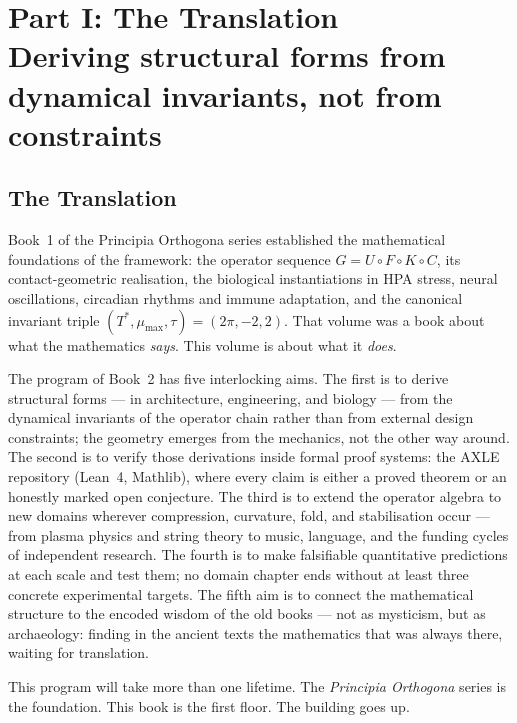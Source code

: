 \part[Part I: The Translation]{Part I: The Translation\\[0.3em]
\large\normalfont Deriving structural forms from dynamical invariants,
not from constraints}

\chapter{The Translation}

\noindent Book~1 of the Principia Orthogona series established the
mathematical foundations of the framework: the operator sequence
$G = U \circ F \circ K \circ C$, its contact-geometric realisation,
the biological instantiations in HPA stress, neural oscillations,
circadian rhythms and immune adaptation, and the canonical invariant
triple $(T^*, \mu_{\max}, \tau) = (2\pi, -2, 2)$. That volume
was a book about what the mathematics \emph{says}. This volume is
about what it \emph{does}.

The program of Book~2 has five interlocking aims. The first is to
derive structural forms --- in architecture, engineering, and biology
--- from the dynamical invariants of the operator chain rather than
from external design constraints; the geometry emerges from the
mechanics, not the other way around. The second is to verify those
derivations inside formal proof systems: the AXLE repository (Lean~4,
Mathlib), where every claim is either a proved theorem or an honestly
marked open conjecture. The third is to extend the operator algebra to
new domains wherever compression, curvature, fold, and stabilisation
occur --- from plasma physics and string theory to music, language,
and the funding cycles of independent research. The fourth is to make
falsifiable quantitative predictions at each scale and test them; no
domain chapter ends without at least three concrete experimental
targets. The fifth aim is to connect the mathematical structure to the
encoded wisdom of the old books --- not as mysticism, but as
archaeology: finding in the ancient texts the mathematics that was
always there, waiting for translation.

This program will take more than one lifetime. The \emph{Principia
Orthogona} series is the foundation. This book is the first floor.
The building goes up.

